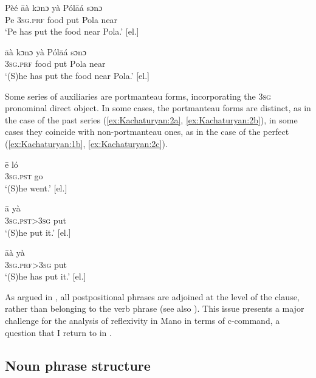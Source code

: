 \documentclass[output=paper]{langscibook}
\begin{document}
 
\ea
\label{ex:Kachaturyan:1}
    \ea
    \label{ex:Kachaturyan:1a}
    \gll Pèé  āà      kɔnɔ  yà    Pólāá  sɔnɔ\\
     Pe  \textsc{3sg.prf}  food  put  Pola    near\\
    \glt ‘Pe has put the food near Pola.’ [el.]
    
    \ex
    \label{ex:Kachaturyan:1b}
    \gll āà  kɔnɔ  yà  Pólāá  sɔnɔ\\
     \textsc{3sg.prf}  food  put  \textsc{P}ola  near\\
    \glt ‘(S)he has put the food near Pola.’ [el.]
    \z
\z

Some series of auxiliaries are portmanteau forms, incorporating the 3\textsc{sg} pronominal direct object. In some cases, the portmanteau forms are distinct, as in the case of the past series (\ref{ex:Kachaturyan:2a}, \ref{ex:Kachaturyan:2b}), in some cases they coincide with non-portmanteau ones, as in the case of the perfect (\ref{ex:Kachaturyan:1b}, \ref{ex:Kachaturyan:2c}).


 
 \ea
\label{ex:Kachaturyan:2}
    \ea
    \label{ex:Kachaturyan:2a}
    \gll ē  ló\\
     3\textsc{sg.pst}  go\\
    \glt ‘(S)he went.’ [el.]

    \ex
    \label{ex:Kachaturyan:2b}
    \gll ā  yà\\
     \textsc{3sg.pst>3sg}  put\\
    \glt ‘(S)he put it.’ [el.]

    \ex
    \label{ex:Kachaturyan:2c}
    \gll āà  yà\\
     \textsc{3sg.prf>3sg}  put\\
    \glt ‘(S)he has put it.’ [el.]
    
\z
    \z

As argued in \citet{Nikitina2009}, all postpositional phrases are adjoined at the level of the clause, rather than belonging to the verb phrase (see also \citealt{Nikitina2018}). This issue presents a major challenge for the analysis of reflexivity in Mano in terms of c-command, a question that I return to  in .

 
\subsection{Noun phrase structure}\label{sec:Kachaturyan:2.2}
\end{document}
